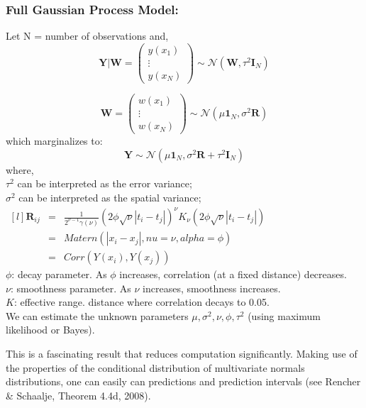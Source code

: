 \documentclass{article}                                                   %
\def\wl{\par \vspace{\baselineskip}}                                      %
\begin{document}
  \subsubsection{Full Gaussian Process Model:}  
    Let N = number of observations and, 
    \[ \bm{Y|W} = \begin{pmatrix} y(x_1) \\ \vdots \\ y(x_N) \end{pmatrix} 
                  \sim \mathcal{N}(\bm W,\tau^2\bm I_N) \]
    \wl
    \[ \bm W =  \begin{pmatrix} w(x_1) \\ \vdots \\ w(x_N) \end{pmatrix}
                \sim \mathcal{N}(\mu\bm 1_N,\sigma^2\bm R) \]
    which marginalizes to:
    \[ \bm Y \sim \mathcal{N}(\mu\bm 1_N,\sigma^2\bm R + \tau^2\bm I_N) \] 
    where,\\
          $\tau^2$ can be interpreted as the error variance; \\
          $\sigma^2$ can be interpreted as the spatial variance; \\
          $ \begin{matrix*}[l]
            \bm R_{ij} & = & \frac{1}{2^{\nu-1}\gamma(\nu)} 
                             (2\phi \sqrt{\nu} |t_i-t_j|)^\nu 
                             K_\nu(2\phi\sqrt{\nu}|t_i-t_j|) \\
                       & = & Matern(|x_i-x_j|,nu=\nu,alpha=\phi) \\
                       & = & Corr(Y(x_i),Y(x_j))
          \end{matrix*} $ \\
          $\phi$: decay parameter. As $\phi$ increases, correlation (at a fixed
          distance) decreases.\\
          $\nu$: smoothness parameter. As $\nu$ increases, smoothness increases.\\
          $K$: effective range. distance where correlation decays to 0.05. \\
          We can estimate the unknown parameters $\mu, \sigma^2, \nu, \phi,
          \tau^2$ (using maximum likelihood or Bayes).
    \wl\noindent
    This is a fascinating result that reduces computation significantly. Making
    use of the properties of the conditional distribution of multivariate normals
    distributions, one can easily can predictions and prediction intervals (see
    Rencher \& Schaalje, Theorem 4.4d, 2008). 
  
\end{document}
